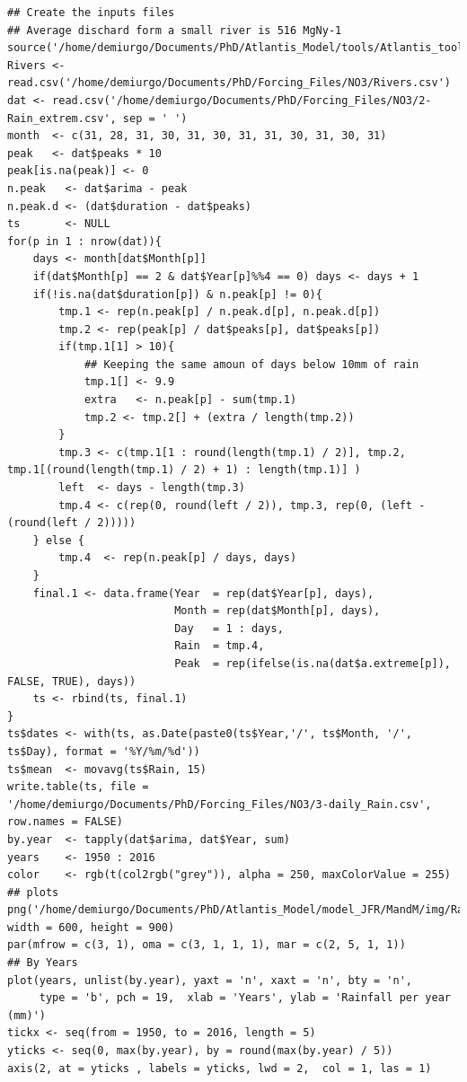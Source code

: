 \documentclass[11pt]{article}
\begin{document}
\begin{verbatim}
## Create the inputs files
## Average dischard form a small river is 516 MgNy-1
source('/home/demiurgo/Documents/PhD/Atlantis_Model/tools/Atlantis_tools.R')
Rivers <- read.csv('/home/demiurgo/Documents/PhD/Forcing_Files/NO3/Rivers.csv')
dat <- read.csv('/home/demiurgo/Documents/PhD/Forcing_Files/NO3/2-Rain_extrem.csv', sep = ' ')
month  <- c(31, 28, 31, 30, 31, 30, 31, 31, 30, 31, 30, 31)
peak   <- dat$peaks * 10
peak[is.na(peak)] <- 0
n.peak   <- dat$arima - peak
n.peak.d <- (dat$duration - dat$peaks)
ts       <- NULL
for(p in 1 : nrow(dat)){
    days <- month[dat$Month[p]]
    if(dat$Month[p] == 2 & dat$Year[p]%%4 == 0) days <- days + 1
    if(!is.na(dat$duration[p]) & n.peak[p] != 0){
        tmp.1 <- rep(n.peak[p] / n.peak.d[p], n.peak.d[p])
        tmp.2 <- rep(peak[p] / dat$peaks[p], dat$peaks[p])
        if(tmp.1[1] > 10){
            ## Keeping the same amoun of days below 10mm of rain
            tmp.1[] <- 9.9
            extra   <- n.peak[p] - sum(tmp.1)
            tmp.2 <- tmp.2[] + (extra / length(tmp.2))
        }
        tmp.3 <- c(tmp.1[1 : round(length(tmp.1) / 2)], tmp.2, tmp.1[(round(length(tmp.1) / 2) + 1) : length(tmp.1)] )
        left  <- days - length(tmp.3)
        tmp.4 <- c(rep(0, round(left / 2)), tmp.3, rep(0, (left - (round(left / 2)))))
    } else {
        tmp.4  <- rep(n.peak[p] / days, days)
    }
    final.1 <- data.frame(Year  = rep(dat$Year[p], days),
                          Month = rep(dat$Month[p], days),
                          Day   = 1 : days,
                          Rain  = tmp.4,
                          Peak  = rep(ifelse(is.na(dat$a.extreme[p]), FALSE, TRUE), days))
    ts <- rbind(ts, final.1)
}
ts$dates <- with(ts, as.Date(paste0(ts$Year,'/', ts$Month, '/', ts$Day), format = '%Y/%m/%d'))
ts$mean  <- movavg(ts$Rain, 15)
write.table(ts, file = '/home/demiurgo/Documents/PhD/Forcing_Files/NO3/3-daily_Rain.csv', row.names = FALSE)
by.year  <- tapply(dat$arima, dat$Year, sum)
years    <- 1950 : 2016
color    <- rgb(t(col2rgb("grey")), alpha = 250, maxColorValue = 255)
## plots
png('/home/demiurgo/Documents/PhD/Atlantis_Model/model_JFR/MandM/img/Rain.ts.png', width = 600, height = 900)
par(mfrow = c(3, 1), oma = c(3, 1, 1, 1), mar = c(2, 5, 1, 1))
## By Years
plot(years, unlist(by.year), yaxt = 'n', xaxt = 'n', bty = 'n',
     type = 'b', pch = 19,  xlab = 'Years', ylab = 'Rainfall per year (mm)')
tickx <- seq(from = 1950, to = 2016, length = 5)
yticks <- seq(0, max(by.year), by = round(max(by.year) / 5))
axis(2, at = yticks , labels = yticks, lwd = 2,  col = 1, las = 1)

\end{verbatim}
\end{document}
